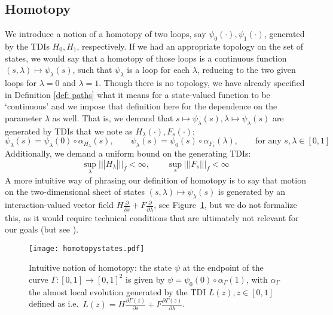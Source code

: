 \subsection{Homotopy}\label{sec: homotopy}

We introduce a notion of a homotopy of two loops, say $\psi_0(\cdot),\psi_1(\cdot)$, generated by the TDIs $H_0, H_1$, respectively. 
If we had an appropriate topology on the set of states, we would say that a homotopy of those loops is a continuous function $(s,\lambda)\mapsto \psi_\lambda(s)$, such that $\psi_\lambda$ is a loop for each $\lambda$, reducing to the two given loops for $\lambda=0$ and $\lambda=1$. 
Though there is no topology,  we have  already specified in Definition \ref{def: paths} what it means for a state-valued function to be `continuous' and we impose that definition here for the dependence on the parameter $\lambda$ as well.  That is, we demand that $s\mapsto \psi_\lambda(s),\lambda\mapsto \psi_\lambda(s) $ are generated by TDIs that we note as $H_\lambda(\cdot), F_s(\cdot)$;
\begin{equation}\label{eq: homotopy}
	\psi_\lambda(s)= \psi_\lambda(0) \circ \alpha_{H_\lambda}(s),\qquad
	\psi_\lambda(s)= \psi_0(s) \circ \alpha_{F_s}(\lambda),\qquad \text{for any $s, \lambda \in[0,1]$}
\end{equation}
Additionally, we demand a uniform bound on the generating TDIs:
\begin{equation}\label{Homotopy: Uniform bound}
	\sup_{\lambda} ||| H_\lambda |||_f <  \infty,\qquad \sup_s  ||| F_s |||_f  <\infty
\end{equation}
A more intuitive way of phrasing our definition of homotopy is to say that motion on the 
two-dimensional sheet of states $(s,\lambda)\mapsto \psi_\lambda(s)$ is generated by an interaction-valued vector field $H\frac{\partial}{\partial s} + F\frac{\partial}{\partial \lambda} $, see Figure~\ref{fig: homotopy states}, but we do not formalize this, as it would require technical conditions that are ultimately not relevant for our goals (but see \cite{kapustin2022local}).

\begin{figure}[h]
	\begin{center}
		\texttt{[image: homotopystates.pdf]}
		\caption{Intuitive notion of homotopy: the state $\psi$ at the endpoint of the curve $\Gamma: [0,1]\to [0,1]^2$ is given by  $\psi=\psi_0(0)\circ \alpha_\Gamma(1)$, with $\alpha_\Gamma$ the almost local evolution generated by the TDI $L(z), z\in [0,1]$  defined as i.e.\  
			$L(z)= H\frac{\partial \Gamma(z)}{\partial s} + F\frac{\partial \Gamma(z)}{\partial \lambda} $. }
		\label{fig: homotopy states}
	\end{center}
\end{figure} 


